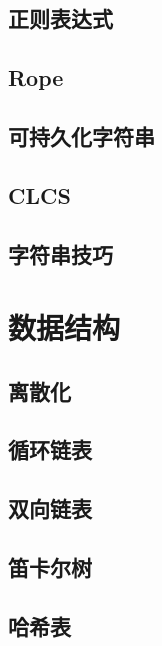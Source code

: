 \documentclass{article}
\begin{document}
\subsection{正则表达式} 


\subsection{Rope} 

\subsection{可持久化字符串} 


\subsection{CLCS} 


\subsection{字符串技巧} 



\newpage %
\section{数据结构} %
\subsection{离散化} 


\subsection{循环链表} 

\subsection{双向链表} 


\subsection{笛卡尔树} 


\subsection{哈希表} 

\end{document}

